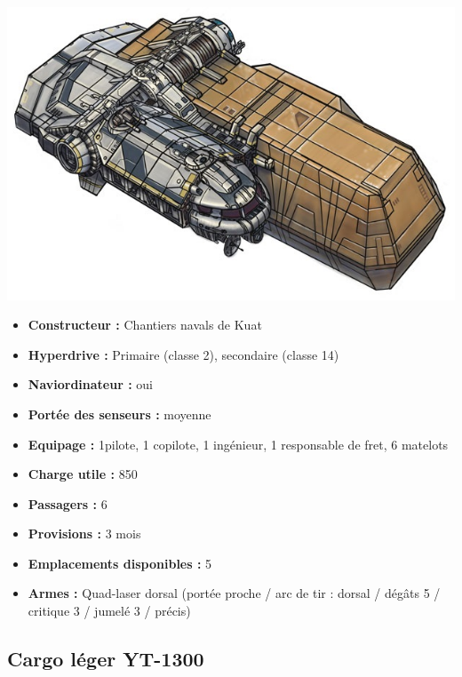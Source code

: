 \documentclass[twoside]{article}
\begin{document}
\noindent\begin{minipage}{0.3\textwidth}
	\includegraphics[width=1\linewidth]{../img/species/wayfarer}
\end{minipage}%
\hfill%
\begin{minipage}{0.7\textwidth}\raggedleft
	\begin{itemize}
		\item \textbf{Constructeur :} Chantiers navals de Kuat
		\item \textbf{Hyperdrive :} Primaire (classe 2), secondaire (classe 14)
		\item \textbf{Naviordinateur :} oui
		\item \textbf{Portée des senseurs :} moyenne
		\item \textbf{Equipage :} 1pilote, 1 copilote, 1 ingénieur, 1 responsable de fret, 6 matelots
		\item \textbf{Charge utile :} 850
		\item \textbf{Passagers :} 6
		\item \textbf{Provisions :} 3 mois
		\item \textbf{Emplacements disponibles :} 5
		\item \textbf{Armes :} Quad-laser dorsal (portée proche / arc de tir : dorsal / dégâts 5 / critique 3 / jumelé 3 / précis)
	\end{itemize}
\end{minipage}

\subsection*{Cargo léger YT-1300}
\end{document}

